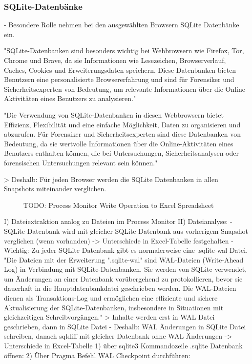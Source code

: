 \subsubsection*{SQLite-Datenbänke}
- Besondere Rolle nehmen bei den ausgewählten Browsern SQLite Datenbänke ein.

"SQLite-Datenbanken sind besonders wichtig bei Webbrowsern wie Firefox, Tor, Chrome und Brave, da sie Informationen wie Lesezeichen, Browserverlauf, Caches, Cookies und Erweiterungsdaten speichern. Diese Datenbanken bieten Benutzern eine personalisierte Browsererfahrung und sind für Forensiker und Sicherheitsexperten von Bedeutung, um relevante Informationen über die Online-Aktivitäten eines Benutzers zu analysieren."

"Die Verwendung von SQLite-Datenbanken in diesen Webbrowsern bietet Effizienz, Flexibilität und eine einfache Möglichkeit, Daten zu organisieren und abzurufen. Für Forensiker und Sicherheitsexperten sind diese Datenbanken von Bedeutung, da sie wertvolle Informationen über die Online-Aktivitäten eines Benutzers enthalten können, die bei Untersuchungen, Sicherheitsanalysen oder forensischen Untersuchungen relevant sein können."

> Deshalb: Für jeden Browser werden die SQLite Datenbanken in allen Snapshots miteinander verglichen.
\begin{figure}[h!]
	\centering
	\small
	\centerline{\resizebox{\linewidth}{!}{}}
	\caption{TODO: Process Monitor Write Operation to Excel Spreadsheet}
	\label{fig:jes}
\end{figure}
I) Dateiextraktion analog zu Dateien im Process Monitor
II) Dateianalyse:
	- SQLite Datenbank wird mit gleicher SQLite Datenbank aus vorherigem Snapshot verglichen (wenn vorhanden) -> Unterschiede in Excel-Tabelle festgehalten
	- Wichtig: Zu jeder SQLite Datenbank gibt es normalerweise eine .sqlite-wal Datei. 
		"Die Dateien mit der Erweiterung ".sqlite-wal" sind WAL-Dateien (Write-Ahead Log) in Verbindung mit SQLite-Datenbanken. Sie werden von SQLite verwendet, um Änderungen an einer Datenbank vorübergehend zu protokollieren, bevor sie dauerhaft in die Hauptdatenbankdatei geschrieben werden. Die WAL-Dateien dienen als Transaktions-Log und ermöglichen eine effiziente und sichere Aktualisierung der SQLite-Datenbanken, insbesondere in Situationen mit gleichzeitigen Schreibvorgängen."
		> Inhalte werden erst in WAL Datei geschrieben, dann in SQLite Datei
	- Deshalb: WAL Änderungen in SQLite Datei schreiben, danach sqldiff mit gleicher Datenbank ohne WAL Änderungen -> Unterschiede in Excel-Tabelle
		1) über sqlite3 Kommandozeile .sqlite Datenbank öffnen: %
		2) Über Pragma Befehl WAL Checkpoint durchführen: %

